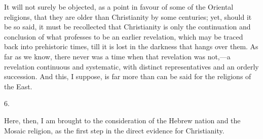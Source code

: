 It will not surely be objected, as a point in favour of some of the
Oriental religions, that they are older than Christianity by some
centuries; yet, should it be so said, it must be recollected that
Christianity is only the continuation and conclusion of what professes
to be an earlier revelation, which may be traced back into prehistoric
times, till it is lost in the darkness that hangs over them. As far as
we know, there never was a time when that revelation was not,—a
revelation continuous and systematic, with distinct representatives
and an orderly succession. And this, I suppose, is far more than can
be said for the religions of the East.

6.

Here, then, I am brought to the consideration of the Hebrew nation
and the Mosaic religion, as the first step in the direct evidence for
Christianity.

